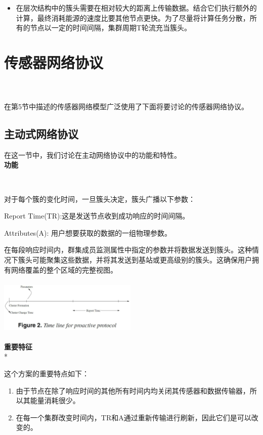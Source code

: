 \documentclass[journal]{IEEEtran}
\begin{document}
\begin{CJK}{UTF8}{gbsn}
\begin{itemize}
  \item 在层次结构中的簇头需要在相对较大的距离上传输数据。结合它们执行额外的计算，最终消耗能源的速度比要其他节点更快。为了尽量将计算任务分散，所有的节点以一定的时间间隔，集群周期T轮流充当簇头。

\end{itemize}

\section{\textbf{传感器网络协议\\ \\ }}

在第5节中描述的传感器网络模型广泛使用了下面将要讨论的传感器网络协议。

\subsection{\textbf{主动式网络协议}}

在这一节中，我们讨论在主动网络协议中的功能和特性。
\\

\textbf{功能}

\

对于每个簇的变化时间，一旦簇头决定，簇头广播以下参数：

Report Time(TR):这是发送节点收到成功响应的时间间隔。

Attributes(A): 用户想要获取的数据的一组物理参数。

在每段响应时间内，群集成员监测属性中指定的参数并将数据发送到簇头。这种情况下簇头可能聚集这些数据，并将其发送到基站或更高级别的簇头。这确保用户拥有网络覆盖的整个区域的完整视图。 


\noindent
\includegraphics[height=100, width=250]{2.eps}

\textbf{重要特征}
\\*

这个方案的重要特点如下：
\\
\begin{enumerate}
 \setcounter{enumi}
 \item 由于节点在除了响应时间的其他所有时间内均关闭其传感器和数据传输器，所以其能量消耗很少。
 \item 在每一个集群改变时间内，TR和A通过重新传输进行刷新，因此它们是可以改变的。
 

\end{enumerate}
\end{CJK}
\end{document}
